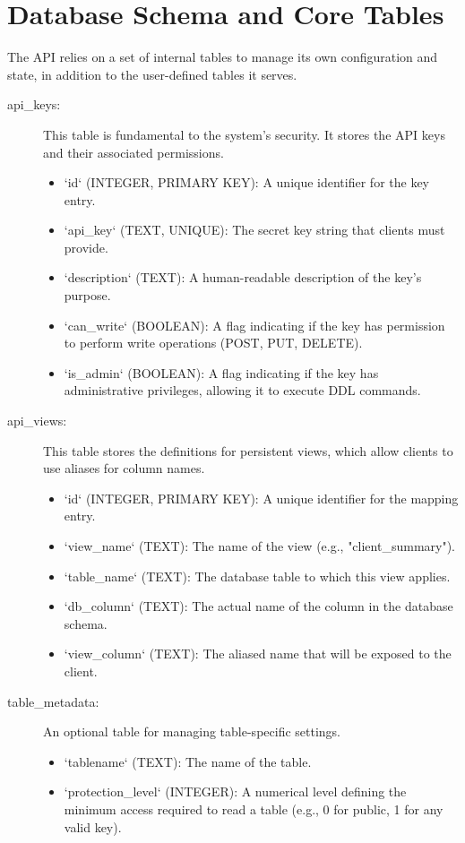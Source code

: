 \documentclass[12pt, a4paper]{report}
\begin{document}
\section{Database Schema and Core Tables}
The API relies on a set of internal tables to manage its own configuration and state, in addition to the user-defined tables it serves.
\begin{description}
    \item[api\_keys:] This table is fundamental to the system's security. It stores the API keys and their associated permissions.
        \begin{itemize}
            \item `id` (INTEGER, PRIMARY KEY): A unique identifier for the key entry.
            \item `api_key` (TEXT, UNIQUE): The secret key string that clients must provide.
            \item `description` (TEXT): A human-readable description of the key's purpose.
            \item `can_write` (BOOLEAN): A flag indicating if the key has permission to perform write operations (POST, PUT, DELETE).
            \item `is_admin` (BOOLEAN): A flag indicating if the key has administrative privileges, allowing it to execute DDL commands.
        \end{itemize}
    \item[api\_views:] This table stores the definitions for persistent views, which allow clients to use aliases for column names.
        \begin{itemize}
            \item `id` (INTEGER, PRIMARY KEY): A unique identifier for the mapping entry.
            \item `view_name` (TEXT): The name of the view (e.g., "client\_summary").
            \item `table_name` (TEXT): The database table to which this view applies.
            \item `db_column` (TEXT): The actual name of the column in the database schema.
            \item `view_column` (TEXT): The aliased name that will be exposed to the client.
        \end{itemize}
    \item[table\_metadata:] An optional table for managing table-specific settings.
        \begin{itemize}
            \item `tablename` (TEXT): The name of the table.
            \item `protection_level` (INTEGER): A numerical level defining the minimum access required to read a table (e.g., 0 for public, 1 for any valid key).
        \end{itemize}
\end{description}
\end{document}
